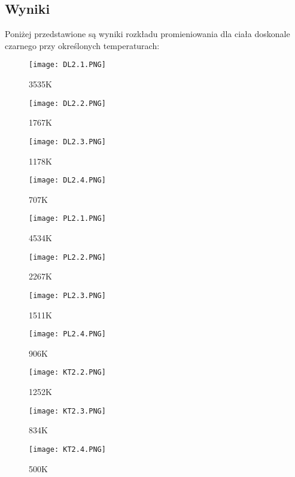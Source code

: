 \documentclass{article}
\begin{document}
\subsection{Wyniki}
Poniżej przedstawione są wyniki rozkładu promieniowania dla ciała doskonale czarnego przy określonych temperaturach:
\begin{figure}[H]
    \texttt{[image: DL2.1.PNG]}
    \caption{3535K}
\end{figure}
\begin{figure}[H]
    \texttt{[image: DL2.2.PNG]}
    \caption{1767K}
\end{figure}
\begin{figure}[H]
    \texttt{[image: DL2.3.PNG]}
    \caption{1178K}
\end{figure}
\begin{figure}[H]
    \texttt{[image: DL2.4.PNG]}
    \caption{707K}
\end{figure}
\begin{figure}[H]
    \texttt{[image: PL2.1.PNG]}
    \caption{4534K}
\end{figure}
\begin{figure}[H]
    \texttt{[image: PL2.2.PNG]}
    \caption{2267K}
\end{figure}
\begin{figure}[H]
    \texttt{[image: PL2.3.PNG]}
    \caption{1511K}
\end{figure}
\begin{figure}[H]
    \texttt{[image: PL2.4.PNG]}
    \caption{906K}
\end{figure}
\begin{figure}[H]
    \texttt{[image: KT2.2.PNG]}
    \caption{1252K}
\end{figure}
\begin{figure}[H]
    \texttt{[image: KT2.3.PNG]}
    \caption{834K}
\end{figure}
\begin{figure}[H]
    \texttt{[image: KT2.4.PNG]}
    \caption{500K}
\end{figure}
\clearpage
\end{document}
